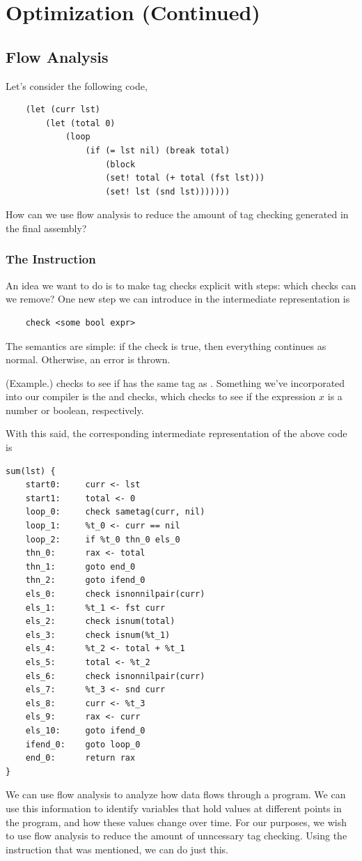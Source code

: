 \documentclass[letterpaper]{article}
\begin{document}
\section{Optimization (Continued)}
\subsection{Flow Analysis}
Let's consider the following code, 
\begin{verbatim}
    (let (curr lst)
        (let (total 0)
            (loop
                (if (= lst nil) (break total)
                    (block
                    (set! total (+ total (fst lst)))
                    (set! lst (snd lst)))))))\end{verbatim}
How can we use flow analysis to reduce the amount of tag checking generated in the final assembly?

\subsubsection{The  Instruction}
An idea we want to do is to make tag checks explicit with  steps: which checks can we remove? One new step we can introduce in the intermediate representation is 
\begin{verbatim}
    check <some bool expr>\end{verbatim} 
The semantics are simple: if the check is true, then everything continues as normal. Otherwise, an error is thrown.
\begin{mdframed}
    (Example.)  checks to see if  has the same tag as . Something we've incorporated into our compiler is the  and  checks, which checks to see if the expression $x$ is a number or boolean, respectively.
\end{mdframed}
With this said, the corresponding intermediate representation of the above code is 
\begin{verbatim}
sum(lst) {
    start0:     curr <- lst
    start1:     total <- 0
    loop_0:     check sametag(curr, nil)
    loop_1:     %t_0 <- curr == nil
    loop_2:     if %t_0 thn_0 els_0
    thn_0:      rax <- total
    thn_1:      goto end_0
    thn_2:      goto ifend_0
    els_0:      check isnonnilpair(curr)
    els_1:      %t_1 <- fst curr
    els_2:      check isnum(total)
    els_3:      check isnum(%t_1)
    els_4:      %t_2 <- total + %t_1
    els_5:      total <- %t_2
    els_6:      check isnonnilpair(curr)
    els_7:      %t_3 <- snd curr
    els_8:      curr <- %t_3
    els_9:      rax <- curr
    els_10:     goto ifend_0
    ifend_0:    goto loop_0
    end_0:      return rax
}\end{verbatim}
We can use flow analysis to analyze how data flows through a program. We can use this information to identify variables that hold values at different points in the program, and how these values change over time. For our purposes, we wish to use flow analysis to reduce the amount of unncessary tag checking. Using the  instruction that was mentioned, we can do just this.
\end{document}
